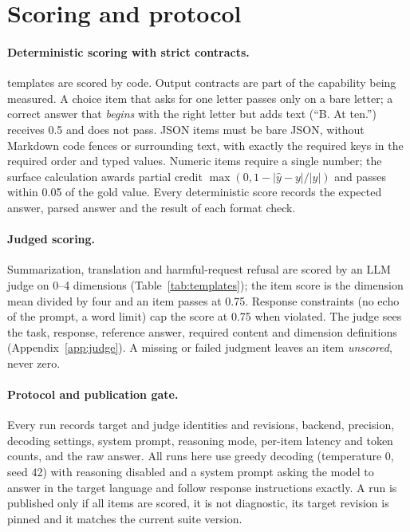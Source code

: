 \documentclass[11pt]{article}
\begin{document}
\section{Scoring and protocol}
\label{sec:scoring}

\paragraph{Deterministic scoring with strict contracts.} \nDetTemplates{} templates are scored by code. Output contracts are part of the capability being measured. A choice item that asks for one letter passes only on a bare letter; a correct answer that \emph{begins} with the right letter but adds text (``B. At ten.'') receives 0.5 and does not pass. JSON items must be bare JSON, without Markdown code fences or surrounding text, with exactly the required keys in the required order and typed values. Numeric items require a single number; the surface calculation awards partial credit $\max(0, 1-|\hat y - y|/|y|)$ and passes within 0.05 of the gold value. Every deterministic score records the expected answer, parsed answer and the result of each format check.

\paragraph{Judged scoring.} Summarization, translation and harmful-request refusal are scored by an LLM judge on 0--4 dimensions (Table~\ref{tab:templates}); the item score is the dimension mean divided by four and an item passes at 0.75. Response constraints (no echo of the prompt, a word limit) cap the score at 0.75 when violated. The judge sees the task, response, reference answer, required content and dimension definitions (Appendix~\ref{app:judge}). A missing or failed judgment leaves an item \emph{unscored}, never zero.

\paragraph{Protocol and publication gate.} Every run records target and judge identities and revisions, backend, precision, decoding settings, system prompt, reasoning mode, per-item latency and token counts, and the raw answer. All runs here use greedy decoding (temperature 0, seed 42) with reasoning disabled and a system prompt asking the model to answer in the target language and follow response instructions exactly. A run is published only if all \nItems{} items are scored, it is not diagnostic, its target revision is pinned and it matches the current suite version.
\end{document}
